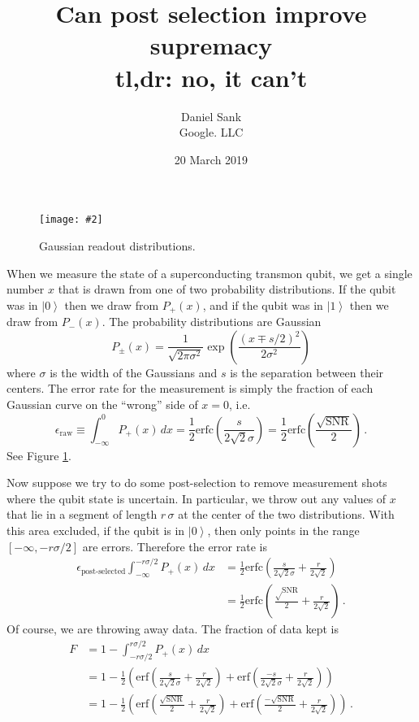 \documentclass{article}
\author{Daniel Sank \\ \small{Google. LLC}}
\title{Can post selection improve supremacy \\ \small{tl,dr: no, it can't}}
\date{20 March 2019}
\newcommand{\ket}[1]{\left \lvert #1 \right \rangle}
\newcommand{\SNR}{\text{SNR}}
\DeclareRobustCommand{\quickfig}[4]{
  \begin{figure}
    \begin{centering}
      \texttt{[image: \#2]}
      \par
    \end{centering}
    \caption{#3}
    \label{#4}
  \end{figure}
}
\begin{document}
\maketitle

\quickfig{0.8\columnwidth}{setup.pdf}{Gaussian readout distributions.}{fig:setup}

When we measure the state of a superconducting transmon qubit, we get a single number $x$ that is drawn from one of two probability distributions.
If the qubit was in $\ket{0}$ then we draw from $P_+(x)$, and if the qubit was in $\ket{1}$ then we draw from $P_-(x)$.
The probability distributions are Gaussian
\begin{equation}
  P_\pm (x) = \frac{1}{\sqrt{2 \pi \sigma^2}} \exp \left( \frac{(x \mp s/2)^2}{2 \sigma^2} \right)
\end{equation}
where $\sigma$ is the width of the Gaussians and $s$ is the separation between their centers.
The error rate for the measurement is simply the fraction of each Gaussian curve on the ``wrong'' side of $x=0$, i.e.
\begin{equation}
  \epsilon_\text{raw} \equiv \int_{-\infty}^0 P_+(x) \, dx
  = \frac{1}{2} \text{erfc} \left(
    \frac{s}{2 \sqrt{2} \sigma}
  \right)
  = \frac{1}{2} \text{erfc} \left(
    \frac{\sqrt{\SNR}}{2}
  \right)
  \, .
\end{equation}
See Figure \ref{fig:setup}.

Now suppose we try to do some post-selection to remove measurement shots where the qubit state is uncertain.
In particular, we throw out any values of $x$ that lie in a segment of length $r \, \sigma$ at the center of the two distributions.
With this area excluded, if the qubit is in $\ket{0}$, then only points in the range $[-\infty, -r \sigma/2]$ are errors.
Therefore the error rate is
\begin{align}
  \epsilon_\text{post-selected}
  \int_{-\infty}^{-r \sigma/2} P_+(x) \, dx
  &= \frac{1}{2} \text{erfc} \left(
    \frac{s}{2 \sqrt{2} \sigma} + \frac{r}{2 \sqrt{2}}
  \right) \\
  &= \frac{1}{2} \text{erfc} \left(
    \frac{\sqrt\SNR}{2} + \frac{r}{2 \sqrt{2}}
  \right)
  \, .
\end{align}
Of course, we are throwing away data.
The fraction of data kept is
\begin{align}
  F
  &= 1 - \int_{-r \sigma / 2}^{r \sigma / 2} P_+(x) \, dx \\
  &= 1 - \frac{1}{2} \left(
    \text{erf} \left(
      \frac{s}{2 \sqrt{2} \sigma} + \frac{r}{2 \sqrt{2}}
    \right)
    + \text{erf} \left(
      \frac{-s}{2 \sqrt{2} \sigma} + \frac{r}{2 \sqrt{2}}
    \right)
  \right) \\
  &= 1 - \frac{1}{2} \left(
    \text{erf} \left(
      \frac{\sqrt{\SNR}}{2} + \frac{r}{2 \sqrt{2}}
    \right)
    + \text{erf} \left(
      \frac{-\sqrt{\SNR}}{2} + \frac{r}{2 \sqrt{2}}
    \right)
  \right)
  \, .
\end{align}
\end{document}
